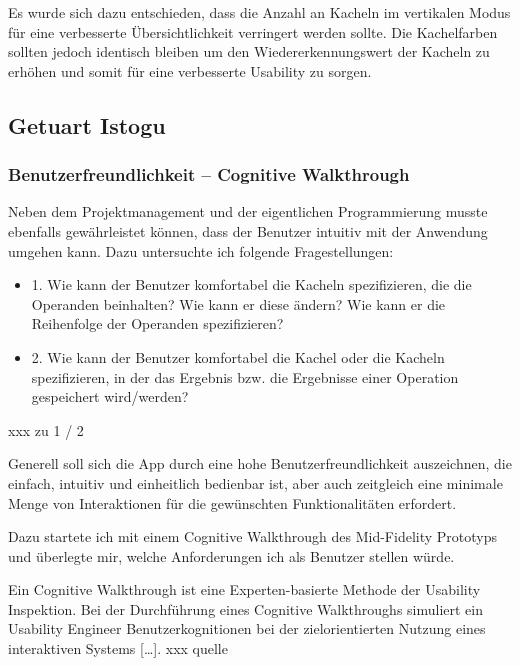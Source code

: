 Es wurde sich dazu entschieden, dass die Anzahl an Kacheln im vertikalen Modus für eine verbesserte Übersichtlichkeit verringert werden sollte. Die Kachelfarben sollten jedoch identisch bleiben um den Wiedererkennungswert der Kacheln zu erhöhen und somit für eine verbesserte Usability zu sorgen.

\subsection{Getuart Istogu}

\subsubsection{Benutzerfreundlichkeit – Cognitive Walkthrough}
Neben dem Projektmanagement und der eigentlichen Programmierung musste ebenfalls gewährleistet können, dass der Benutzer intuitiv mit der Anwendung umgehen kann. Dazu untersuchte ich folgende Fragestellungen:

\begin{itemize}
	\item 1. Wie kann der Benutzer komfortabel die Kacheln spezifizieren, die die Operanden beinhalten? Wie kann er diese ändern? Wie kann er die Reihenfolge der Operanden spezifizieren?
	\item 2. Wie kann der Benutzer komfortabel die Kachel oder die Kacheln spezifizieren, in der das Ergebnis bzw. die Ergebnisse einer Operation gespeichert wird/werden?
\end{itemize}
xxx zu 1 / 2

Generell soll sich die App durch eine hohe Benutzerfreundlichkeit auszeichnen, die einfach, intuitiv und einheitlich bedienbar ist, aber auch zeitgleich eine minimale Menge von Interaktionen für die gewünschten Funktionalitäten erfordert.

Dazu startete ich mit einem Cognitive Walkthrough des Mid-Fidelity Prototyps und überlegte mir, welche Anforderungen ich als Benutzer stellen würde. 

Ein Cognitive Walkthrough ist eine Experten-basierte Methode der Usability Inspektion. Bei der Durchführung eines Cognitive Walkthroughs simuliert ein Usability Engineer Benutzerkognitionen bei der zielorientierten Nutzung eines interaktiven Systems […].  xxx quelle

